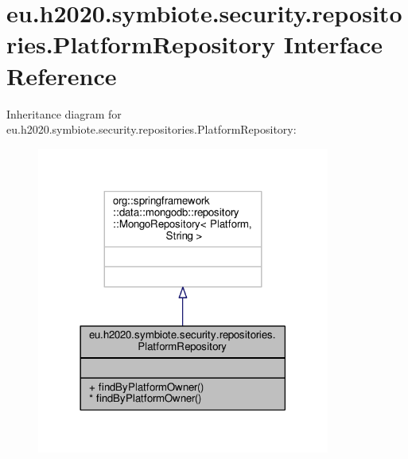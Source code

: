 \hypertarget{interfaceeu_1_1h2020_1_1symbiote_1_1security_1_1repositories_1_1PlatformRepository}{}\section{eu.\+h2020.\+symbiote.\+security.\+repositories.\+Platform\+Repository Interface Reference}
\label{interfaceeu_1_1h2020_1_1symbiote_1_1security_1_1repositories_1_1PlatformRepository}


Inheritance diagram for eu.\+h2020.\+symbiote.\+security.\+repositories.\+Platform\+Repository\+:
\nopagebreak
\begin{figure}[H]
\begin{center}
\leavevmode
\includegraphics[width=273pt]{interfaceeu_1_1h2020_1_1symbiote_1_1security_1_1repositories_1_1PlatformRepository__inherit__graph}
\end{center}
\end{figure}


